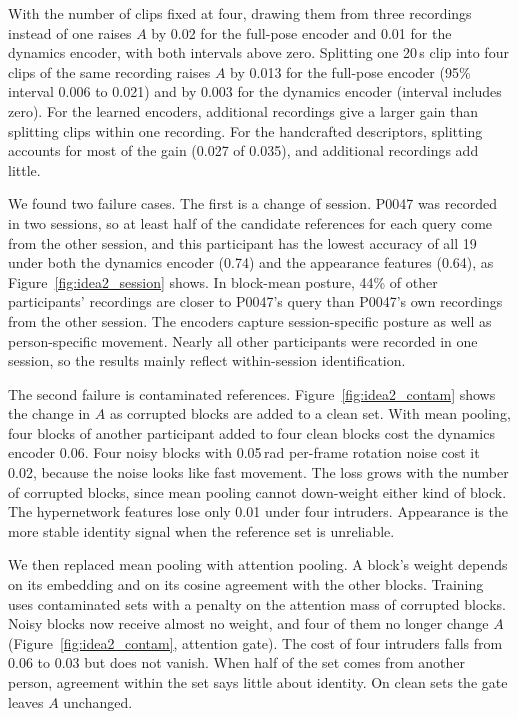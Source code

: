 With the number of clips fixed at four, drawing them from three recordings instead of one raises $A$ by 0.02 for the full-pose encoder and 0.01 for the dynamics encoder, with both intervals above zero. Splitting one 20\,s clip into four clips of the same recording raises $A$ by 0.013 for the full-pose encoder (95\% interval 0.006 to 0.021) and by 0.003 for the dynamics encoder (interval includes zero). For the learned encoders, additional recordings give a larger gain than splitting clips within one recording. For the handcrafted descriptors, splitting accounts for most of the gain (0.027 of 0.035), and additional recordings add little.

We found two failure cases. The first is a change of session. P0047 was recorded in two sessions, so at least half of the candidate references for each query come from the other session, and this participant has the lowest accuracy of all 19 under both the dynamics encoder (0.74) and the appearance features (0.64), as Figure~\ref{fig:idea2_session} shows. In block-mean posture, 44\% of other participants' recordings are closer to P0047's query than P0047's own recordings from the other session. The encoders capture session-specific posture as well as person-specific movement. Nearly all other participants were recorded in one session, so the results mainly reflect within-session identification.

The second failure is contaminated references. Figure~\ref{fig:idea2_contam} shows the change in $A$ as corrupted blocks are added to a clean set. With mean pooling, four blocks of another participant added to four clean blocks cost the dynamics encoder 0.06. Four noisy blocks with 0.05\,rad per-frame rotation noise cost it 0.02, because the noise looks like fast movement. The loss grows with the number of corrupted blocks, since mean pooling cannot down-weight either kind of block. The hypernetwork features lose only 0.01 under four intruders. Appearance is the more stable identity signal when the reference set is unreliable.

We then replaced mean pooling with attention pooling. A block's weight depends on its embedding and on its cosine agreement with the other blocks. Training uses contaminated sets with a penalty on the attention mass of corrupted blocks. Noisy blocks now receive almost no weight, and four of them no longer change $A$ (Figure~\ref{fig:idea2_contam}, attention gate). The cost of four intruders falls from 0.06 to 0.03 but does not vanish. When half of the set comes from another person, agreement within the set says little about identity. On clean sets the gate leaves $A$ unchanged.


